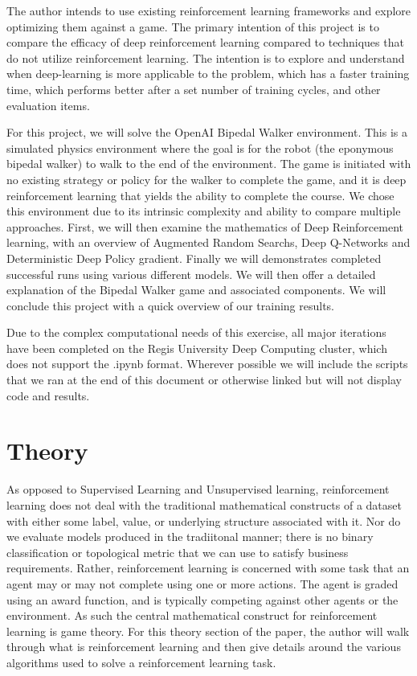 \documentclass[doc, onecolumn, 12pt]{apa6}
\begin{document}
The author intends to use existing reinforcement learning frameworks and explore optimizing them against a game. The primary intention of this project is to compare the efficacy of deep reinforcement learning compared to techniques that do not utilize reinforcement learning. The intention is to explore and understand when deep-learning is more applicable to the problem, which has a faster training time, which performs better after a set number of training cycles, and other evaluation items. 

For this project, we will solve the OpenAI Bipedal Walker environment. This is a simulated physics environment where the goal is for the robot (the eponymous bipedal walker) to walk to the end of the environment. The game is initiated with no existing strategy or policy for the walker to complete the game, and it is deep reinforcement learning that yields the ability to complete the course. We chose this environment due to its intrinsic complexity and ability to compare multiple approaches. First, we will then examine the mathematics of Deep Reinforcement learning, with an overview of Augmented Random Searchs, Deep Q-Networks and Deterministic Deep Policy gradient. Finally we will demonstrates completed successful runs using various different models. We will then offer a detailed explanation of the Bipedal Walker game and associated components. We will conclude this project with a quick overview of our training results. 

Due to the complex computational needs of this exercise, all major iterations have been completed on the Regis University Deep Computing cluster, which does not support the .ipynb format. Wherever possible we will include the scripts that we ran at the end of this document or otherwise linked but will not display code and results.


\section{Theory}
As opposed to Supervised Learning and Unsupervised learning, reinforcement learning does not deal with the traditional mathematical constructs of a dataset with either some label, value, or underlying structure associated with it. Nor do we evaluate models produced in the tradiitonal manner; there is no binary classification or topological metric that we can use to satisfy business requirements. Rather, reinforcement learning is concerned with some task that an agent may or may not complete using one or more actions. The agent is graded using an award function, and is typically competing against other agents or the environment. As such the central mathematical construct for reinforcement learning is game theory. For this theory section of the paper, the author will walk through what is reinforcement learning and then give details around the various algorithms used to solve a reinforcement learning task. 
\end{document}
